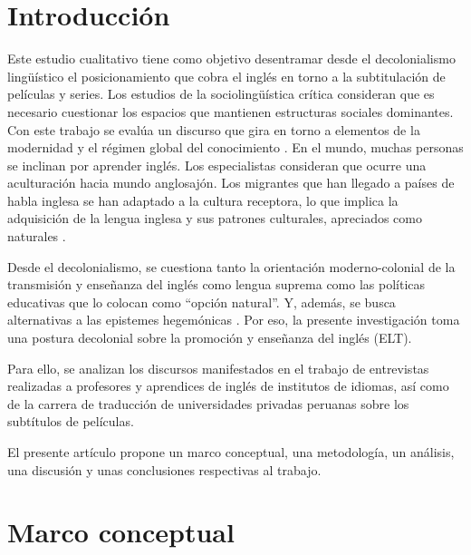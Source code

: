 \documentclass[spanish]{textolivre}
\begin{document}
\begin{polyabstract}
\begin{english}
\begin{abstract}
\end{abstract}
\end{english}
\end{polyabstract}

\section{Introducción}
Este estudio cualitativo tiene como objetivo desentramar desde el decolonialismo lingüístico el posicionamiento que cobra el inglés en torno a la subtitulación de películas y series. Los estudios de la sociolingüística crítica consideran que es necesario cuestionar los espacios que mantienen estructuras sociales dominantes. Con este trabajo se evalúa un discurso que gira en torno a elementos de la modernidad y el régimen global del conocimiento \cite{heiss_pluriversalizar_2018}. En el mundo, muchas personas se inclinan por aprender inglés. Los especialistas consideran que ocurre una aculturación hacia mundo anglosajón. Los migrantes que han llegado a países de habla inglesa se han adaptado a la cultura receptora, lo que implica la adquisición de la lengua inglesa y sus patrones culturales, apreciados como naturales \cite{brown_principles_1994}.

Desde el decolonialismo, se cuestiona tanto la orientación moderno-colonial de la transmisión y enseñanza del inglés como lengua suprema como las políticas educativas que lo colocan como “opción natural”. Y, además, se busca alternativas a las epistemes hegemónicas \cite{jaramillo2013}. Por eso, la presente investigación toma una postura decolonial sobre la promoción y enseñanza del inglés (ELT).

Para ello, se analizan los discursos manifestados en el trabajo de entrevistas realizadas a profesores y aprendices de inglés de institutos de idiomas, así como de la carrera de traducción de universidades privadas peruanas sobre los subtítulos de películas.

El presente artículo propone un marco conceptual, una metodología, un análisis, una discusión y unas conclusiones respectivas al trabajo.


\section{Marco conceptual}
\end{document}
